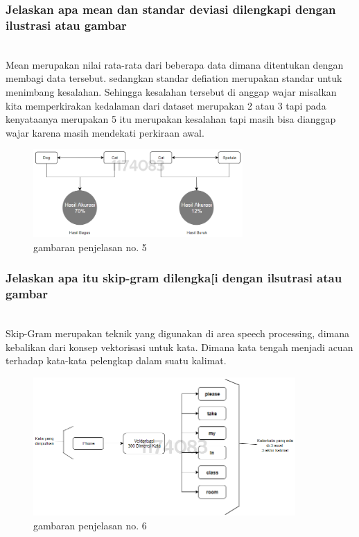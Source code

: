 \subsubsection{Jelaskan apa mean dan standar deviasi dilengkapi dengan ilustrasi atau gambar}
\hfill\\
Mean merupakan nilai rata-rata dari beberapa data dimana ditentukan dengan membagi data tersebut. sedangkan standar defiation merupakan standar untuk menimbang kesalahan. Sehingga kesalahan tersebut di anggap wajar misalkan kita memperkirakan kedalaman dari dataset merupakan 2 atau 3 tapi pada kenyataanya
merupakan 5 itu merupakan kesalahan tapi masih bisa dianggap wajar karena masih mendekati perkiraan awal.
\begin{figure}[H]
	\centering
	\includegraphics[width=8cm]{figures/1174083/figures5/5.png}
	\caption{gambaran penjelasan no. 5}
\end{figure}

\subsubsection{Jelaskan apa itu skip-gram dilengka[i dengan ilsutrasi atau gambar}
\hfill\\
Skip-Gram merupakan teknik yang digunakan di area speech processing, dimana kebalikan dari konsep vektorisasi untuk kata. Dimana kata tengah menjadi acuan terhadap kata-kata pelengkap dalam suatu kalimat.
\begin{figure}[H]
	\centering
	\includegraphics[width=10cm]{figures/1174083/figures5/6.png}
	\caption{gambaran penjelasan no. 6}
\end{figure}

